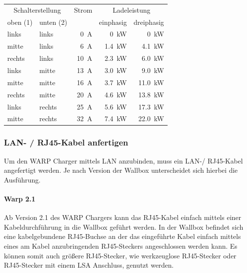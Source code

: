 \documentclass[a4paper,10pt]{article}
\begin{document}
\begin{multicols*}{2}
    \begin{tabular}{lp{}rrr}
        \toprule
        \multicolumn{2}{c}{Schalterstellung} & Strom            & \multicolumn{2}{c}{Ladeleistung}             \\
        \small{oben (1)} & \small{unten (2)} &                  & \small{einphasig}    & \small{dreiphasig}    \\
        \midrule
        links            & links             & \SI{0}{\ampere}  & \SI{0}{\kilo\watt}   & \SI{0}{\kilo\watt}    \\
        mitte            & links             & \SI{6}{\ampere}  & \SI{1.4}{\kilo\watt} & \SI{4.1}{\kilo\watt}  \\
        rechts           & links             & \SI{10}{\ampere} & \SI{2.3}{\kilo\watt} & \SI{6.0}{\kilo\watt}  \\
        links            & mitte             & \SI{13}{\ampere} & \SI{3.0}{\kilo\watt} & \SI{9.0}{\kilo\watt}  \\
        mitte            & mitte             & \SI{16}{\ampere} & \SI{3.7}{\kilo\watt} & \SI{11.0}{\kilo\watt} \\
        rechts           & mitte             & \SI{20}{\ampere} & \SI{4.6}{\kilo\watt} & \SI{13.8}{\kilo\watt} \\
        links            & rechts            & \SI{25}{\ampere} & \SI{5.6}{\kilo\watt} & \SI{17.3}{\kilo\watt} \\
        mitte            & rechts            & \SI{32}{\ampere} & \SI{7.4}{\kilo\watt} & \SI{22.0}{\kilo\watt} \\
        \bottomrule
    \end{tabular}

    \newpage
    \subsubsection{LAN- / RJ45-Kabel anfertigen}\label{ethernet}

    Um den WARP Charger mittels LAN anzubinden, muss ein LAN-/ RJ45-Kabel
    angefertigt werden. Je nach Version der Wallbox unterscheidet sich hierbei
    die Ausführung.

    \paragraph{Warp 2.1}

    Ab Version 2.1 des WARP Chargers kann das RJ45-Kabel einfach mittels einer
    Kabeldurchführung in die Wallbox geführt werden. In der Wallbox befindet
    sich eine kabelgebundene RJ45-Buchse an der das eingeführte Kabel einfach
    mittels eines am Kabel anzubringenden RJ45-Steckers angeschlossen werden
    kann. Es können somit auch größere RJ45-Stecker, wie werkzeuglose RJ45-Stecker oder RJ45-Stecker
	mit einem LSA Anschluss, genutzt werden.


\end{multicols*}
\end{document}
